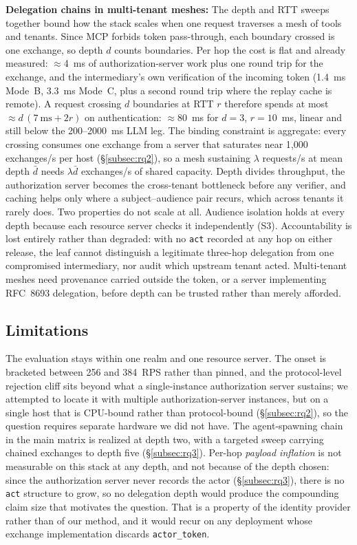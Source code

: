 \documentclass[conference]{IEEEtran}
\begin{document}
\textbf{Delegation chains in multi-tenant meshes:}
The depth and RTT sweeps together bound how the stack scales when one request traverses a mesh of tools and tenants. Since MCP forbids token pass-through, each boundary crossed is one exchange, so depth $d$ counts boundaries. Per hop the cost is flat and already measured: $\approx$4~ms of authorization-server work plus one round trip for the exchange, and the intermediary's own verification of the incoming token (1.4~ms Mode~B, 3.3~ms Mode~C, plus a second round trip where the replay cache is remote). A request crossing $d$ boundaries at RTT $r$ therefore spends at most $\approx d\,(7~\mathrm{ms} + 2r)$ on authentication: $\approx$80~ms for $d=3$, $r=10$~ms, linear and still below the 200--2000~ms LLM leg. The binding constraint is aggregate: every crossing consumes one exchange from a server that saturates near 1{,}000 exchanges/s per host (\S\ref{subsec:rq2}), so a mesh sustaining $\lambda$ requests/s at mean depth $\bar d$ needs $\lambda\bar d$ exchanges/s of shared capacity. Depth divides throughput, the authorization server becomes the cross-tenant bottleneck before any verifier, and caching helps only where a subject--audience pair recurs, which across tenants it rarely does. Two properties do not scale at all. Audience isolation holds at every depth because each resource server checks it independently (S3). Accountability is lost entirely rather than degraded: with no \texttt{act} recorded at any hop on either release, the leaf cannot distinguish a legitimate three-hop delegation from one compromised intermediary, nor audit which upstream tenant acted. Multi-tenant meshes need provenance carried outside the token, or a server implementing RFC~8693 delegation, before depth can be trusted rather than merely afforded.

\subsection{Limitations}
\label{subsec:limits}
The evaluation stays within one realm and one resource server. The onset is bracketed between 256 and 384~RPS rather than pinned, and the protocol-level rejection cliff sits beyond what a single-instance authorization server sustains; we attempted to locate it with multiple authorization-server instances, but on a single host that is CPU-bound rather than protocol-bound (\S\ref{subsec:rq2}), so the question requires separate hardware we did not have. The agent-spawning chain in the main matrix is realized at depth two, with a targeted sweep carrying chained exchanges to depth five (\S\ref{subsec:rq3}). Per-hop \emph{payload inflation} is not measurable on this stack at any depth, and not because of the depth chosen: since the authorization server never records the actor (\S\ref{subsec:rq3}), there is no \texttt{act} structure to grow, so no delegation depth would produce the compounding claim size that motivates the question. That is a property of the identity provider rather than of our method, and it would recur on any deployment whose exchange implementation discards \texttt{actor\_token}.
\end{document}
